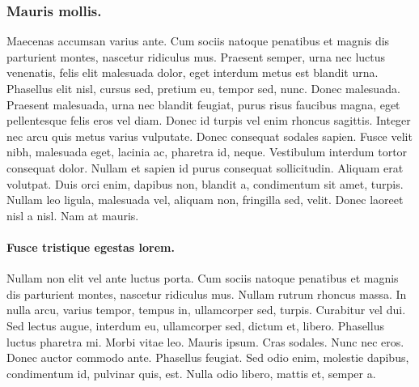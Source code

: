 \subsubsection{Mauris mollis.}
Maecenas accumsan varius ante. Cum sociis natoque penatibus et magnis dis parturient montes, nascetur ridiculus mus. Praesent semper, urna nec luctus venenatis, felis elit malesuada dolor, eget interdum metus est blandit urna. Phasellus elit nisl, cursus sed, pretium eu, tempor sed, nunc. Donec malesuada. Praesent malesuada, urna nec blandit feugiat, purus risus faucibus magna, eget pellentesque felis eros vel diam. Donec id turpis vel enim rhoncus sagittis. Integer nec arcu quis metus varius vulputate. Donec consequat sodales sapien. Fusce velit nibh, malesuada eget, lacinia ac, pharetra id, neque. Vestibulum interdum tortor consequat dolor. Nullam et sapien id purus consequat sollicitudin. Aliquam erat volutpat. Duis orci enim, dapibus non, blandit a, condimentum sit amet, turpis. Nullam leo ligula, malesuada vel, aliquam non, fringilla sed, velit. Donec laoreet nisl a nisl. Nam at mauris.

\paragraph{Fusce tristique egestas lorem.} Nullam non elit vel ante luctus porta. Cum sociis natoque penatibus et magnis dis parturient montes, nascetur ridiculus mus. Nullam rutrum rhoncus massa. In nulla arcu, varius tempor, tempus in, ullamcorper sed, turpis. Curabitur vel dui. Sed lectus augue, interdum eu, ullamcorper sed, dictum et, libero. Phasellus luctus pharetra mi. Morbi vitae leo. Mauris ipsum. Cras sodales. Nunc nec eros. Donec auctor commodo ante. Phasellus feugiat. Sed odio enim, molestie dapibus, condimentum id, pulvinar quis, est. Nulla odio libero, mattis et, semper a. 


